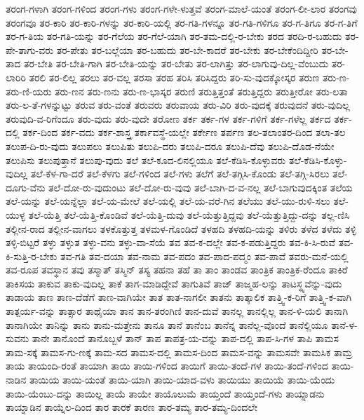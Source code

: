 {ತರಂಗ-ಗಳಾಗಿ
ತರಂಗ-ಗಳಿಂದ
ತರಂಗ-ಗಳು
ತರಂಗ-ಗಳೇ-ಳುತ್ತವೆ
ತರಂಗ-ಮಾಲೆ-ಯಂತೆ
ತರಂಗ-ಲೀ-ಲಾರ
ತರಂಗವು
ತರಂಗವೂ
ತರ-ಕಾರಿ
ತರ-ಕಾರಿ-ಗಳನ್ನು
ತರ-ಕಾರಿ-ಯಲ್ಲಿ
ತರ-ಗತಿ-ಗಳನ್ನೂ
ತರ-ಗತಿ-ಗಳಿಗೂ
ತರ-ಗ-ತಿಗೂ
ತರ-ಗ-ತಿಗೆ
ತರ-ಗ-ತಿಯ
ತರ-ಗತಿ-ಯನ್ನು
ತರ-ಗೆಲೆಯ
ತರ-ಗೆಲೆ-ಯಾಗಿ
ತರ-ತಮ-ದಲ್ಲಿ-ರ-ಬೇಕು
ತರದ
ತರದಿ-ರ-ಬಹುದು
ತರ-ಪೇ-ತಾಗು-ವರು
ತರ-ಪೇತು
ತರ-ಬಲ್ಲೆಯಾ
ತರ-ಬಹುದು
ತರ-ಬೇ-ಕಾದರೆ
ತರ-ಬೇಕು
ತರ-ಬೇಕೆಂದಿದ್ದೀರಿ
ತರ-ಬೇ-ತಾದ
ತರ-ಬೇತಿ
ತರ-ಬೇತಿ-ಗಾಗಿ
ತರ-ಬೇತಿ-ಯನ್ನು
ತರ-ಬೇತು
ತರ-ಲಾಗಿತ್ತು
ತರ-ಲಾಗುವು-ದಿಲ್ಲ-ವೆಂಬುದು
ತರ-ಲಾರಿರಿ
ತರಲಿ
ತರ-ಲಿಲ್ಲ
ತರಲು
ತರ-ವಲ್ಲ
ತರಸಾ
ತರಹ
ತರಿಸಿ
ತರಿಸಿದ್ದರು
ತರಿ-ಸು-ವುದಕ್ಕೋಸ್ಕರ
ತರುಣ
ತರು-ಣ-ತರು-ಣಿ-ಯರು
ತರು-ಣನ
ತರು-ಣನು
ತರು-ಣ-ಭಾಸ್ಕರ
ತರುಣಿ
ತರುತ್ತಿತ್ತಂತೆ
ತರುತ್ತಿದ್ದರು
ತರುತ್ತೀರೋ
ತರು-ಲತಾ
ತರು-ಲ-ತೆ-ಗಳನ್ನುಟ್ಟು
ತರುವ
ತರು-ವಂತೆ
ತರುವರು
ತರುವಾಯ
ತರು-ವಿರಿ
ತರು-ವುದಕ್ಕೆ
ತರುವುದನೆ
ತರು-ವುದಿಲ್ಲ
ತರುವುದಿ-ವ-ರಿಗೆಂದೂ
ತರು-ವುದು
ತರು-ವುದೇ
ತರೋಣ
ತರ್ಕ
ತರ್ಕ-ಗಳ
ತರ್ಕ-ಗಳಿಗೆ
ತರ್ಕ-ಗಳೆಲ್ಲ
ತರ್ಕದ
ತರ್ಕ-ದಲ್ಲಿ
ತರ್ಕ-ದಿಂದ
ತರ್ಕ-ವದು
ತರ್ಕ-ಶಾಸ್ತ್ರ
ತರ್ಕಾವಸ್ಥೆ-ಯಲ್ಲೇ
ತರ್ಕೇಣ
ತರ್ಪಣ
ತಲ-ತಲಾಂತರ-ದಿಂದ
ತಲಾ-ತಲ
ತಲುಪ-ದಿ-ರು-ವುದು
ತಲುಪಲು
ತಲುಪಿತು
ತಲುಪಿ-ದರು
ತಲುಪಿ-ದರೂ
ತಲುಪಿ-ದೆವು
ತಲುಪಿ-ದೊಡ-ನೆಯೇ
ತಲುಪಿಸು
ತಲುಪುತ್ತಾನೆ
ತಲುಪು-ವುದು
ತಲೆ
ತಲೆ-ಕೂದ-ಲಿನಲ್ಲಿಯೂ
ತಲೆ-ಕೆಡಿಸಿ-ಕೊಳ್ಳುವರು
ತಲೆ-ಕೆಡಿಸಿ-ಕೊಳ್ಳು-ವುದಿಲ್ಲ
ತಲೆ-ಕೆಳ-ಗಾ-ದರೆ
ತಲೆ-ಕೆಳಗು
ತಲೆ-ಗಳಿಂದ
ತಲೆ-ಗಳು
ತಲೆಗೆ
ತಲೆ-ತಗ್ಗಿಸಿ-ಕೊಂಡು
ತಲೆ-ತಗ್ಗಿ-ಸಿರಲು
ತಲೆ-ದೂಗು-ವೆನು
ತಲೆ-ದೋ-ರು-ವುದುಂಟು
ತಲೆ-ದೋ-ರು-ವುವು
ತಲೆ-ಬಾಗಿ-ದ-ವ-ನಲ್ಲ
ತಲೆ-ಬಾಗುವುದಕ್ಕಿಂತ
ತಲೆಯ
ತಲೆ-ಯನ್ನು
ತಲೆ-ಯನ್ನೆಲ್ಲಾ
ತಲೆ-ಯ-ಮೇಲೆ
ತಲೆ-ಯಲ್ಲಿ
ತಲೆ-ಯ-ವರೆ-ಗಿನ
ತಲೆಯು
ತಲೆ-ಯು-ರುಳಿ-ಸಲು
ತಲೆ-ಯುಳ್ಳ
ತಲೆ-ಯೆತ್ತಿ
ತಲೆ-ಯೆತ್ತಿ-ಕೊಂಡಿವೆ
ತಲೆ-ಯೆತ್ತಿ-ದುವು
ತಲೆ-ಯೆತ್ತುತ್ತಿದ್ದವು
ತಲೆ-ಯೆತ್ತುತ್ತಿದ್ದು-ದನ್ನು
ತಲ್ಲ-ಣಿಸಿ
ತಲ್ಲೀನ-ರಾದ
ತಲ್ಲೀನ-ವಾಗಲು
ತಳಕೊತ್ತುತ್ತ
ತಳಮಳ-ಗೊಂಡಿದೆ
ತಳಹದಿ
ತಳಹದಿ-ಯನ್ನು
ತಳಿರು
ತಳೆದ
ತಳೆದು
ತಳ್ಳಿ
ತಳ್ಳಿ-ಬಿಟ್ಟರೆ
ತಳ್ಳು
ತಳ್ಳುತ
ತಳ್ಳು-ವನು
ತಳ್ಳು-ವಾ-ಸೆಯೆ
ತವ
ತವ-ಕ-ದಲ್ಲೇ
ತವ-ಕ-ಪಡುತ್ತಿದ್ದರು
ತವ-ಕಿ-ಸಿ-ರುವೆ
ತವ-ಕಿ-ಸುತ್ತಿ-ರ-ಬೇಕು
ತವ-ಗತಿ
ತವ-ದಯಾ
ತವ-ನಾಮ
ತವ-ಪದಂ
ತವ-ಪಾದ-ಪದ್ಮಂ
ತವ-ಪಾವೆ
ತವರು-ಮನೆ-ಯಲ್ಲಿ
ತವ-ರೂಪ
ತವಸ್ಥಾನ
ತವು
ತಸ್ಮಾತ್
ತಸ್ಮಿನ್
ತಸ್ಯ
ತಹನಾ
ತಹೆ
ತಾ
ತಾಂ
ತಾಂಡವ
ತಾಂತ್ರಿಕ
ತಾಂತ್ರಿಕ-ರೆಂದೂ
ತಾಕಿರೆ
ತಾಕಿಸಯ
ತಾಕುವ
ತಾಕು-ವುದಿಲ್ಲ
ತಾಕೆ
ತಾಗ-ಮಾಡಿದ್ದೇವೆ
ತಾಗುತಿವೆ
ತಾಜ್
ತಾಜ್ಮಹ-ಲನ್ನು
ತಾಟಸ್ಥ್ಯವೆನ್ನು-ವುದು
ತಾಡಾಯ
ತಾಣ
ತಾಣ-ದೆಡೆಗೆ
ತಾಣ-ವಾಗಿಯೇ
ತಾತ
ತಾತ-ನಾಗಲೀ
ತಾತನು
ತಾತ್ಕಾಲಿಕ
ತಾತ್ತ್ವಿ-ಕ-ರಿಗೆ
ತಾತ್ತ್ವಿ-ಕ-ವಾಗಿ
ತಾತ್ಪರ್ಯ-ವನ್ನು
ತಾತ್ಸಾರ
ತಾಥೈಯಾ
ತಾನ
ತಾನ-ತರಂಗಿಣಿ
ತಾನ-ದುವೆ
ತಾನಲ್ಲ
ತಾನಲ್ಲಿಲ್ಲ
ತಾನ-ಳಿ-ಯಲಿ
ತಾನಾಗಿ
ತಾನಾಗಿಯೇ
ತಾನಿನ್ನು
ತಾನು
ತಾನು-ಮತ್ತೇನು
ತಾನೂ
ತಾನೆ
ತಾನೆಂಬ
ತಾನೆನ್ನ
ತಾನೆಲ್ಲ-ವೊಂದೆ
ತಾನೆಲ್ಲಿಯೂ
ತಾನೆ-ಳ-ಸುವನು
ತಾನೇ
ತಾನೊಂದೆ
ತಾನೊಬ್ಬಳೆ
ತಾನ್
ತಾಪ
ತಾಪತ್ರ-ಯ-ವನ್ನು
ತಾಪ-ದಲ್ಲಿ
ತಾಪ-ಸಿ-ಗಳ
ತಾಪಿ
ತಾಮಸ
ತಾಮ-ಸಕ್ಕೆ
ತಾಮಸ-ಗು-ಣಕ್ಕೆ
ತಾಮ-ಸದ
ತಾಮಸ-ದಲ್ಲಿ
ತಾಮಸ-ದಿಂದ
ತಾಮಸ-ವನ್ನು
ತಾಮಸವೇ
ತಾಮಸಿಕ
ತಾಮ್ರ
ತಾಯ
ತಾಯಂದಿ-ರಂತೆ
ತಾಯಾಗಿ
ತಾಯಿ
ತಾಯಿ-ಗಳಿಂದ
ತಾಯಿಗೆ
ತಾಯಿ-ತಂದೆ-ಗಳ
ತಾಯಿ-ತಂದೆ-ಗಳಿಂದ
ತಾಯಿ-ನಾಡಿನ
ತಾಯಿಯ
ತಾಯಿ-ಯಂತೆ
ತಾಯಿ-ಯಾಗಿ
ತಾಯಿ-ಯಾದ-ವಳು
ತಾಯಿಯು
ತಾಯಿಯೆ
ತಾಯಿ-ಯೆಂದು
ತಾಯಿ-ಯೆಂಬು-ದನ್ನು
ತಾಯಿಲ್ಲ
ತಾಯೆ
ತಾಯೇ
ತಾಯೊಲುಮೆ
ತಾಯ್ತಂದೆ
ತಾಯ್ತಂದೆ-ಗಳು
ತಾಯ್ನಾಡನು
ತಾಯ್ನಾಡಿನ
ತಾಯ್ನೆಲ-ದಿಂದ
ತಾರ
ತಾರಕೆ
ತಾರಣ
ತಾರ-ತಮ್ಯ
ತಾರ-ತಮ್ಯ-ದಿಂದಲೇ
}
